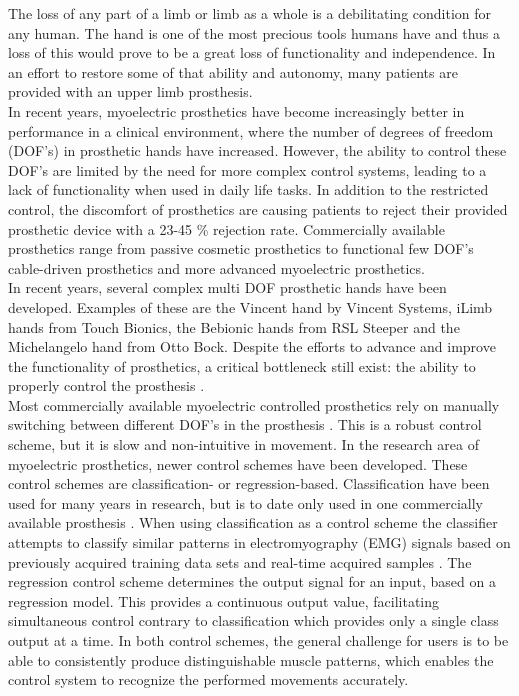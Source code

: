 The loss of any part of a limb or limb as a whole is a debilitating condition for any human. The hand is one of the most precious tools humans have and thus a loss of this would prove to be a great loss of functionality and independence. In an effort to restore some of that ability and autonomy, many patients are provided with an upper limb prosthesis. \cite{Peerdeman2011} \\
In recent years, myoelectric prosthetics have become increasingly better in performance in a clinical environment, where the number of degrees of freedom (DOF's) in prosthetic hands have increased. However, the ability to control these DOF’s are limited by the need for more complex control systems, leading to a lack of functionality when used in daily life tasks. In addition to the restricted control, the discomfort of prosthetics are causing patients to reject their provided prosthetic device with a 23-45 \% rejection rate. \cite{Biddiss2007} Commercially available prosthetics range from passive cosmetic prosthetics to functional few DOF's cable-driven prosthetics and more advanced myoelectric prosthetics. \\
In recent years, several complex multi DOF prosthetic hands have been developed. Examples of these are the Vincent hand by Vincent Systems, iLimb hands from Touch Bionics, the Bebionic hands from RSL Steeper and the Michelangelo hand from Otto Bock. \cite{Belter2013} Despite the efforts to advance and improve the functionality of prosthetics, a critical bottleneck still exist: the ability to properly control the prosthesis \cite{Hwang2017}. \\
Most commercially available myoelectric controlled prosthetics rely on manually switching between different DOF's in the prosthesis \cite{Fougner2012}. This is a robust control scheme, but it is slow and non-intuitive in movement. In the research area of myoelectric prosthetics, newer control schemes have been developed. %
These control schemes are classification- or regression-based. Classification have been used for many years in research, but is to date only used in one commercially available prosthesis \cite{Coapt2018}. When using classification as a control scheme the classifier attempts to classify similar patterns in electromyography (EMG) signals based on previously acquired training data sets and real-time acquired samples \cite{Fougner2012, Scheme2015}. The regression control scheme determines the output signal for an input, based on a regression model. This provides a continuous output value, facilitating simultaneous control contrary to classification which provides only a single class output at a time. \cite{Hwang2017, Hahne2014} In both control schemes, the general challenge for users is to be able to consistently produce distinguishable muscle patterns, which enables the control system to recognize the performed movements accurately. \cite{Powell2014} \\
